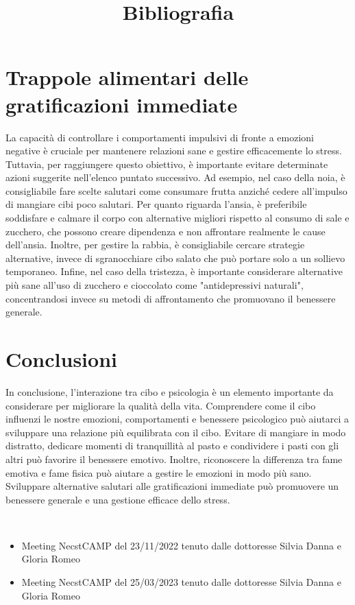\documentclass[12pt,oneside,a4paper]{article}
\begin{document}
\section{Trappole alimentari delle gratificazioni immediate } \label{sec:trap}
La capacità di controllare i comportamenti impulsivi di fronte a emozioni negative è cruciale per mantenere relazioni sane e gestire efficacemente lo stress. Tuttavia, per raggiungere questo obiettivo, è importante evitare determinate azioni suggerite nell'elenco puntato successivo. Ad esempio, nel caso della noia, è consigliabile fare scelte salutari come consumare frutta anziché cedere all'impulso di mangiare cibi poco salutari. Per quanto riguarda l'ansia, è preferibile soddisfare e calmare il corpo con alternative migliori rispetto al consumo di sale e zucchero, che possono creare dipendenza e non affrontare realmente le cause dell'ansia. Inoltre, per gestire la rabbia, è consigliabile cercare strategie alternative, invece di sgranocchiare cibo salato che può portare solo a un sollievo temporaneo. Infine, nel caso della tristezza, è importante considerare alternative più sane all'uso di zucchero e cioccolato come "antidepressivi naturali", concentrandosi invece su metodi di affrontamento che promuovano il benessere generale. 

\section{Conclusioni} \label{sec:concl}
In conclusione, l'interazione tra cibo e psicologia è un elemento importante da considerare per migliorare la qualità della vita. Comprendere come il cibo influenzi le nostre emozioni, comportamenti e benessere psicologico può aiutarci a sviluppare una relazione più equilibrata con il cibo. Evitare di mangiare in modo distratto, dedicare momenti di tranquillità al pasto e condividere i pasti con gli altri può favorire il benessere emotivo. Inoltre, riconoscere la differenza tra fame emotiva e fame fisica può aiutare a gestire le emozioni in modo più sano. Sviluppare alternative salutari alle gratificazioni immediate può promuovere un benessere generale e una gestione efficace dello stress. 


\newpage
\title{\textbf{Bibliografia}} \\
\begin{itemize}
\item Meeting NecstCAMP del 23/11/2022 tenuto dalle dottoresse Silvia Danna e Gloria Romeo
\item Meeting NecstCAMP del 25/03/2023 tenuto dalle dottoresse Silvia Danna e Gloria Romeo
\end{itemize}
\end{document}
